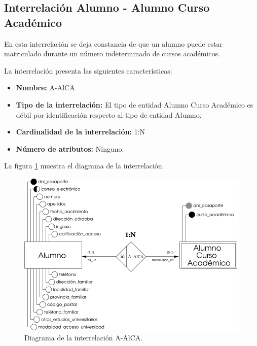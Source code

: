 \subsection{Interrelación Alumno - Alumno Curso Académico}

   \begin{description}
      \item[Definición] En esta interrelación se deja constancia de que un
      alumno puede estar matriculado durante un número indeterminado de cursos
      académicos.

      \item[Características] La interrelación presenta las siguientes
                             características:

         \begin{itemize}
            \item \textbf{Nombre:} A-AlCA
            \item \textbf{Tipo de la interrelación:} El tipo de entidad
                  Alumno Curso Académico es débil por identificación respecto al
                  tipo de entidad Alumno.
            \item \textbf{Cardinalidad de la interrelación:} 1:N
            \item \textbf{Número de atributos:} Ninguno.
         \end{itemize}

      \item[Diagrama] La figura \ref{diagramaA-AlCA} muestra el diagrama de la
                      interrelación.

      \item \begin{figure}[!ht]
            \begin{center}
            \includegraphics[]{07.Modelo_Entidad-Interrelacion/7.3.Analisis_Interrelaciones/diagramas/A-AlCA.pdf}
            \caption{Diagrama de la interrelación A-AlCA.}
            \label{diagramaA-AlCA}
            \end{center}
         \end{figure}


\end{description}
